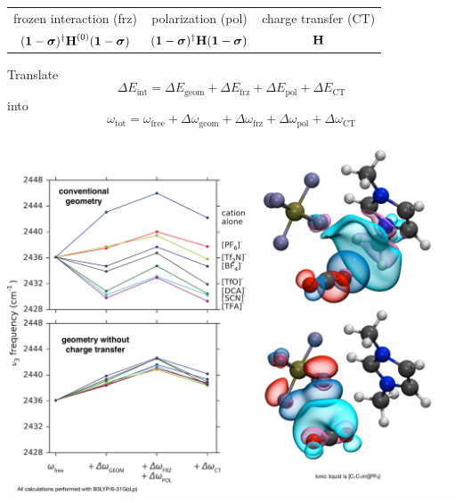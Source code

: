 \documentclass[%
    xcolor=usenames,dvipsnames,svgnames%
]{beamer}
\newenvironment{nscenter}
 {\parskip=0pt\par\nopagebreak\centering}
 {\par\noindent\ignorespacesafterend}
\begin{document}
\begin{frame}
\begin{table}
\begin{tabular}{ccc}
      frozen interaction (frz) & polarization (pol) & charge transfer (CT) \\
      \((\boldsymbol{\mathbf{1}} - \boldsymbol{\mathbf{\sigma}})^{\dagger} \boldsymbol{\mathbf{H}}^{(0)} (\boldsymbol{\mathbf{1}} - \boldsymbol{\mathbf{\sigma}})\) & \((\boldsymbol{\mathbf{1}} - \boldsymbol{\mathbf{\sigma}})^{\dagger} \boldsymbol{\mathbf{H}} (\boldsymbol{\mathbf{1}} - \boldsymbol{\mathbf{\sigma}})\) & \(\boldsymbol{\mathbf{H}}\)
    \end{tabular}
  \end{table}
  Translate
  \begin{equation*}
    \Delta E_{\text{int}} = \Delta E_{\text{geom}} + \Delta E_{\text{frz}} + \Delta E_{\text{pol}} + \Delta E_{\text{CT}}
  \end{equation*}
  into
  \begin{equation*}
    \omega_{\text{tot}} = \omega_{\text{free}} + \Delta \omega_{\text{geom}} + \Delta \omega_{\text{frz}} + \Delta \omega_{\text{pol}} + \Delta \omega_{\text{CT}}
  \end{equation*}
\end{frame}


\begin{frame}[fragile]
  \frametitle{}
  \begin{nscenter}
    \includegraphics[scale=0.27]{./figures/ionic_liquid_geometry_dependence_on_ct_combined.pdf}
  \end{nscenter}
\end{frame}
\end{document}
